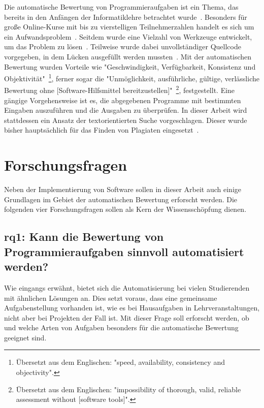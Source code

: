 Die automatische Bewertung von Programmieraufgaben ist ein Thema, das bereits in den Anfängen der Informatiklehre betrachtet wurde~\cite{hollingsworth-1960}.
Besonders für große Online-Kurse mit bis zu vierstelligen Teilnehmerzahlen handelt es sich um ein Aufwandsproblem~\cite{pieterse-2013}.
Seitdem wurde eine Vielzahl von Werkzeuge entwickelt, um das Problem zu lösen~\cite{jackson-1997-assyst,edwards-2008-web-cat,enstroem-et-al-2011,vander-zanden-2012}.
Teilweise wurde dabei unvollständiger Quellcode vorgegeben, in dem Lücken ausgefüllt werden mussten~\cite{vander-zanden-2012}.
Mit der automatischen Bewertung wurden Vorteile wie "Geschwindigkeit, Verfügbarkeit, Konsistenz und Objektivität"~\cite{ala-mutka-2005}\footnote{
    Übersetzt aus dem Englischen: "speed, availability, consistency and objectivity".
}, ferner sogar die "Unmöglichkeit, ausführliche, gültige, verlässliche Bewertung ohne [Software-Hilfsmittel bereitzustellen]"~\cite{kay-1994}\footnote{
    Übersetzt aus dem Englischen: "impossibility of thorough, valid, reliable assessment without [software tools]".
}, festgestellt.
Eine gängige Vorgehensweise ist es, die abgegebenen Programme mit bestimmten Eingaben auszuführen und die Ausgaben zu überprüfen.
In dieser Arbeit wird stattdessen ein Ansatz der textorientierten Suche vorgeschlagen.
Dieser wurde bisher hauptsächlich für das Finden von Plagiaten eingesetzt~\cite{aiken-2002,prechelt-2003}.

\section{Forschungsfragen}\label{sec:research-questions}

Neben der Implementierung von Software sollen in dieser Arbeit auch einige Grundlagen im Gebiet der automatischen Bewertung erforscht werden.
Die folgenden vier Forschungsfragen sollen als Kern der Wissensschöpfung dienen.

\subsection[\acs{rq}1]{\ac{rq}1: Kann die Bewertung von Programmieraufgaben sinnvoll automatisiert werden?}\label{subsec:rq1-useful-automation}

Wie eingangs erwähnt, bietet sich die Automatisierung bei vielen Studierenden mit ähnlichen Lösungen an.
Dies setzt voraus, dass eine gemeinsame Aufgabenstellung vorhanden ist, wie es bei Hausaufgaben in Lehrveranstaltungen, nicht aber bei Projekten der Fall ist.
Mit dieser Frage soll erforscht werden, ob und welche Arten von Aufgaben besonders für die automatische Bewertung geeignet sind.

